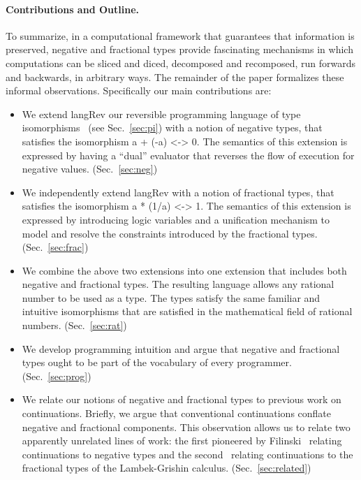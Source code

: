 \documentclass[preprint]{sigplanconf}
\begin{document}

\paragraph*{Contributions and Outline.} 
To summarize, in a computational framework that guarantees that information
is preserved, negative and fractional types provide fascinating mechanisms in
which computations can be sliced and diced, decomposed and recomposed, run
forwards and backwards, in arbitrary ways. The remainder of the paper
formalizes these informal observations. Specifically our main contributions
are:
\begin{itemize}
\item We extend {{langRev}} our reversible programming language of type
  isomorphisms~\cite{rc2011,infeffects} (see Sec.~\ref{sec:pi}) with a notion
  of negative types, that satisfies the isomorphism {{a + (-a) <-> 0}}. The
  semantics of this extension is expressed by having a ``dual'' evaluator
  that reverses the flow of execution for negative
  values. (Sec.~\ref{sec:neg})
\item We independently extend {{langRev}} with a notion of fractional types,
  that satisfies the isomorphism {{a * (1/a) <-> 1}}. The semantics of this
  extension is expressed by introducing logic variables and a unification
  mechanism to model and resolve the constraints introduced by the fractional
  types. (Sec.~\ref{sec:frac})
\item We combine the above two extensions into one extension that includes
  both negative and fractional types. The resulting language allows any
  rational number to be used as a type. The types satisfy the same familiar
  and intuitive isomorphisms that are satisfied in the mathematical field of
  rational numbers. (Sec.~\ref{sec:rat})
\item We develop programming intuition and argue that negative and fractional
  types ought to be part of the vocabulary of every
  programmer. (Sec.~\ref{sec:prog})
\item We relate our notions of negative and fractional types to previous work
  on continuations. Briefly, we argue that conventional continuations
  conflate negative and fractional components. This observation allows us to
  relate two apparently unrelated lines of work: the first pioneered by
  Filinski~\cite{Filinski:1989:DCI:648332.755574} relating continuations to
  negative types and the second~\cite{Bernardi:2010:CSL:1749618.1749689}
  relating continuations to the fractional types of the Lambek-Grishin
  calculus. (Sec.~\ref{sec:related})
\end{itemize}
\end{document}
